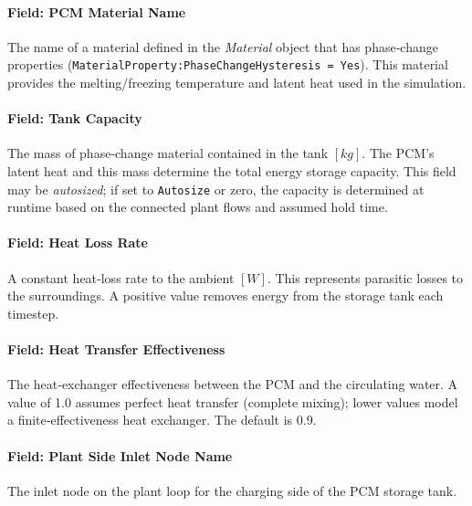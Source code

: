 \paragraph{Field: PCM Material Name}\label{field-pcmstorage-pcm-material-name}

The name of a material defined in the \emph{Material} object that has phase‐change properties (\lstinline!MaterialProperty:PhaseChangeHysteresis = Yes!).  This material provides the melting/freezing temperature and latent heat used in the simulation.

\paragraph{Field: Tank Capacity}\label{field-pcmstorage-tank-capacity}

The mass of phase‐change material contained in the tank \([kg]\).  The PCM’s latent heat and this mass determine the total energy storage capacity.  This field may be \emph{autosized}; if set to \texttt{Autosize} or zero, the capacity is determined at runtime based on the connected plant flows and assumed hold time.

\paragraph{Field: Heat Loss Rate}\label{field-pcmstorage-heat-loss-rate}

A constant heat‐loss rate to the ambient \([W]\).  This represents parasitic losses to the surroundings.  A positive value removes energy from the storage tank each timestep.

\paragraph{Field: Heat Transfer Effectiveness}\label{field-pcmstorage-effectiveness}

The heat‐exchanger effectiveness between the PCM and the circulating water.  A value of 1.0 assumes perfect heat transfer (complete mixing); lower values model a finite‐effectiveness heat exchanger.  The default is 0.9.

\paragraph{Field: Plant Side Inlet Node Name}\label{field-pcmstorage-plant-side-inlet-node-name}

The inlet node on the plant loop for the charging side of the PCM storage tank.

